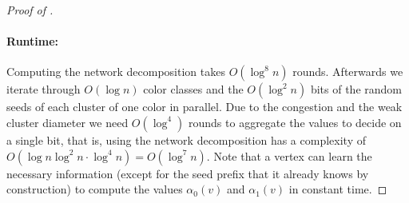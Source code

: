 \begin{proof}[Proof of ]
\paragraph{Runtime:}
Computing the network decomposition takes $O(\log^8 n)$ rounds. Afterwards we iterate through $O(\log n)$ color classes and the $O(\log^2 n)$ bits of the random seeds of each cluster of one color in parallel. Due to the congestion and the weak cluster diameter we need $O(\log^4)$ rounds to aggregate the values to decide on a single bit, that is, using the network decomposition has a complexity of $O(\log n\log^2 n\cdot \log^4 n)=O(\log^7 n)$. Note that a vertex can learn the necessary information (except for the seed prefix that it already knows by construction) to compute the values $\alpha_0(v)$ and $\alpha_1(v)$ in constant time.
\end{proof}

